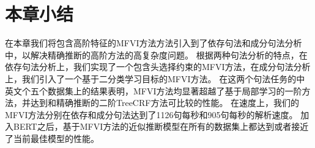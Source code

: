 \section{本章小结}

在本章我们将包含高阶特征的MFVI方法方法引入到了依存句法和成分句法分析中，以解决精确推断的高阶方法的高复杂度问题。
根据两种句法分析的特点，在依存句法分析上，我们实现了一个包含头选择约束的MFVI方法，在成分句法分析上，我们引入了一个基于二分类学习目标的MFVI方法。
在这两个句法任务的中英文个五个数据集上的结果表明，MFVI方法均显著超越了基于局部学习的一阶方法，并达到和精确推断的二阶TreeCRF方法可比较的性能。
在速度上，我们的MFVI方法分别在依存和成分句法达到了1126句每秒和905句每秒的解析速度。
加入BERT之后，基于MFVI方法的近似推断模型在所有的数据集上都达到或者接近了当前最佳模型的性能。
